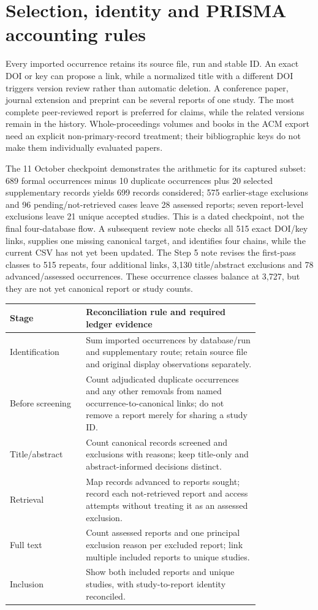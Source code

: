 \section{Selection, identity and PRISMA accounting rules}
\label{sec:accounting-rules}
Every imported occurrence retains its source file, run and stable ID. An exact DOI or key can propose a link, while a normalized title with a different DOI triggers version review rather than automatic deletion. A conference paper, journal extension and preprint can be several reports of one study. The most complete peer-reviewed report is preferred for claims, while the related versions remain in the history. Whole-proceedings volumes and books in the ACM export need an explicit non-primary-record treatment; their bibliographic keys do not make them individually evaluated papers.

The 11 October checkpoint demonstrates the arithmetic for its captured subset: 689 formal occurrences minus 10 duplicate occurrences plus 20 selected supplementary records yields 699 records considered; 575 earlier-stage exclusions and 96 pending/not-retrieved cases leave 28 assessed reports; seven report-level exclusions leave 21 unique accepted studies. This is a dated checkpoint, not the final four-database flow. A subsequent review note checks all 515 exact DOI/key links, supplies one missing canonical target, and identifies four chains, while the current CSV has not yet been updated. The Step 5 note revises the first-pass classes to 515 repeats, four additional links, 3,130 title/abstract exclusions and 78 advanced/assessed occurrences. These occurrence classes balance at 3,727, but they are not yet canonical report or study counts. 

\begin{longtable}{P{0.24\linewidth}P{0.57\linewidth}}
\toprule Stage & Reconciliation rule and required ledger evidence\\\midrule\endhead
Identification & Sum imported occurrences by database/run and supplementary route; retain source file and original display observations separately.\\
Before screening & Count adjudicated duplicate occurrences and any other removals from named occurrence-to-canonical links; do not remove a report merely for sharing a study ID.\\
Title/abstract & Count canonical records screened and exclusions with reasons; keep title-only and abstract-informed decisions distinct.\\
Retrieval & Map records advanced to reports sought; record each not-retrieved report and access attempts without treating it as an assessed exclusion.\\
Full text & Count assessed reports and one principal exclusion reason per excluded report; link multiple included reports to unique studies.\\
Inclusion & Show both included reports and unique studies, with study-to-report identity reconciled.\\
\bottomrule\end{longtable}


